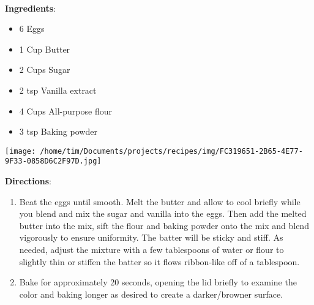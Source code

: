 \documentclass[11pt, twoside, openany]{book}
\begin{document}
 \label{a-sweeter-variation-with-butter}\hfill\textit{}\\
\begin{minipage}[t]{0.8\linewidth}
\textbf{Ingredients}:\vspace{-3mm}
\begin{multicols}{2}
\begin{itemize}\setlength\itemsep{-1mm}
\item 6 Eggs
\item 1 Cup Butter
\item 2 Cups Sugar
\item 2 tsp Vanilla extract
\item 4 Cups All-purpose flour
\item 3 tsp Baking powder
\end{itemize}
\end{multicols}
\end{minipage}
\begin{minipage}[t]{0.2\linewidth}
\centering \strut\vspace*{-\baselineskip}\newline
\texttt{[image: /home/tim/Documents/projects/recipes/img/FC319651-2B65-4E77-9F33-0858D6C2F97D.jpg]}\\
\end{minipage}\vspace{3mm}
\textbf{Directions}:
\vspace{-3mm}\begin{enumerate}\setlength\itemsep{-1mm}
\item Beat the eggs until smooth. Melt the butter and allow to cool briefly while you blend and mix the sugar and vanilla into the eggs. Then add the melted butter into the mix, sift the flour and baking powder onto the mix and blend vigorously to ensure uniformity. The batter will be sticky and stiff. As needed, adjust the mixture with a few tablespoons of water or flour to slightly thin or stiffen the batter so it flows ribbon-like off of a tablespoon.
\item Bake for approximately 20 seconds, opening the lid briefly to examine the color and baking longer as desired to create a darker/browner surface.
\end{enumerate}
 \label{quintessential-veggie-quesadilla}\hfill\textit{}\\
\end{document}
